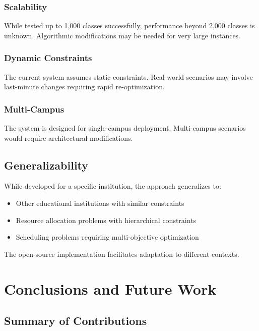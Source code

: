 \documentclass[algorithms,article,submit,pdftex,moreauthors]{Definitions/mdpi}
\begin{document}
\subsubsection{Scalability}

While tested up to 1,000 classes successfully, performance beyond 2,000 classes is unknown. Algorithmic modifications may be needed for very large instances.

\subsubsection{Dynamic Constraints}

The current system assumes static constraints. Real-world scenarios may involve last-minute changes requiring rapid re-optimization.

\subsubsection{Multi-Campus}

The system is designed for single-campus deployment. Multi-campus scenarios would require architectural modifications.

\subsection{Generalizability}

While developed for a specific institution, the approach generalizes to:

\begin{itemize}
\item Other educational institutions with similar constraints
\item Resource allocation problems with hierarchical constraints
\item Scheduling problems requiring multi-objective optimization
\end{itemize}

The open-source implementation facilitates adaptation to different contexts.

\section{Conclusions and Future Work}

\subsection{Summary of Contributions}
\end{document}
